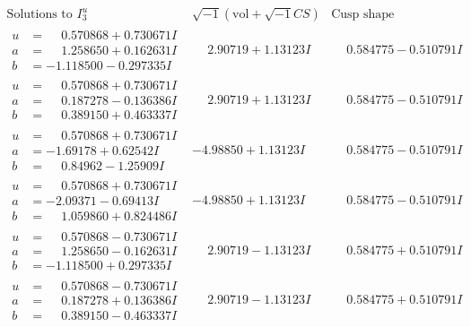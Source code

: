 \documentclass[1p]{elsarticle_modified}
\theoremstyle{definition}
\newcommand{\I}{\sqrt{-1}}
\begin{document}
$$\begin{array}{c|c|c}  
\text{Solutions to }I^u_{3}& \I (\text{vol} + \sqrt{-1}CS) & \text{Cusp shape}\\
 \hline 
\begin{aligned}
u &= \phantom{-}0.570868 + 0.730671 I \\
a &= \phantom{-}1.258650 + 0.162631 I \\
b &= -1.118500 - 0.297335 I\end{aligned}
 & \phantom{-}2.90719 + 1.13123 I & \phantom{-}0.584775 - 0.510791 I \\ \hline\begin{aligned}
u &= \phantom{-}0.570868 + 0.730671 I \\
a &= \phantom{-}0.187278 - 0.136386 I \\
b &= \phantom{-}0.389150 + 0.463337 I\end{aligned}
 & \phantom{-}2.90719 + 1.13123 I & \phantom{-}0.584775 - 0.510791 I \\ \hline\begin{aligned}
u &= \phantom{-}0.570868 + 0.730671 I \\
a &= -1.69178 + 0.62542 I \\
b &= \phantom{-}0.84962 - 1.25909 I\end{aligned}
 & -4.98850 + 1.13123 I & \phantom{-}0.584775 - 0.510791 I \\ \hline\begin{aligned}
u &= \phantom{-}0.570868 + 0.730671 I \\
a &= -2.09371 - 0.69413 I \\
b &= \phantom{-}1.059860 + 0.824486 I\end{aligned}
 & -4.98850 + 1.13123 I & \phantom{-}0.584775 - 0.510791 I \\ \hline\begin{aligned}
u &= \phantom{-}0.570868 - 0.730671 I \\
a &= \phantom{-}1.258650 - 0.162631 I \\
b &= -1.118500 + 0.297335 I\end{aligned}
 & \phantom{-}2.90719 - 1.13123 I & \phantom{-}0.584775 + 0.510791 I \\ \hline\begin{aligned}
u &= \phantom{-}0.570868 - 0.730671 I \\
a &= \phantom{-}0.187278 + 0.136386 I \\
b &= \phantom{-}0.389150 - 0.463337 I\end{aligned}
 & \phantom{-}2.90719 - 1.13123 I & \phantom{-}0.584775 + 0.510791 I \\ \hline\begin{aligned}

\end{aligned}
\end{array}$$
\end{document}
